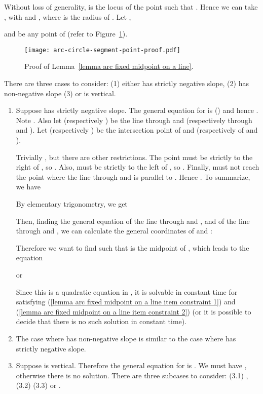\documentclass[11pt, oneside]{article}
\begin{document}
\proof
Without loss of generality,
 is the locus of the point 
such that .
Hence we can take
,
 with 
and ,
where  is the radius of .
Let ,

and  be any point of 
(refer to Figure~\ref{arc-circle-segment-point-proof}).
\begin{figure}
\centering
\texttt{[image: arc-circle-segment-point-proof.pdf]}
\caption{Proof of Lemma~\ref{lemma arc fixed midpoint on a line}.\label{arc-circle-segment-point-proof}}
\end{figure}
There are three cases to consider:
(1) either  has strictly negative slope,
(2)  has non-negative slope
(3) or  is vertical.

\begin{enumerate}
\item[(1)] Suppose  has strictly negative slope.
The general equation for  is  ()
and hence .
Note .
Also let  
(respectively )
be the line through  and 
(respectively through  and ).
Let  
(respectively )
be the intersection point of  and 
(respectively of  and ).

Trivially ,
but there are other restrictions.
The point  must be strictly to the right of ,
so .
Also,  must be strictly to the left of , 
so .
Finally,
 must not reach the point
where the line through  and 
is parallel to .
Hence .
To summarize,
we have


By elementary trigonometry,
we get

Then,
finding the general equation of the line through  and ,
and of the line through  and ,
we can calculate the general coordinates of  and :

Therefore we want to find  such that
 is the midpoint of ,
which leads to the equation

or

Since this is a quadratic equation in ,
it is solvable in constant time 
for  satisfying (\ref{lemma arc fixed midpoint on a line item constraint 1})
and (\ref{lemma arc fixed midpoint on a line item constraint 2})
(or it is possible to decide 
that there is no such solution in constant time).

\item[(2)] The case where  has non-negative slope
is similar to the case where  has strictly negative slope.

\item[(3)] Suppose  is vertical.
Therefore the general equation for  is .
We must have
,
otherwise there is no solution.
There are three subcases to consider:
(3.1) ,
(3.2) 
(3.3) or .


\end{enumerate}
\end{document}
